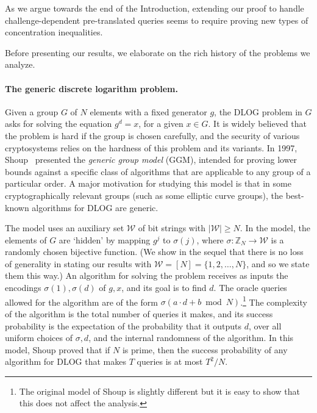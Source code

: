 \documentclass[11pt]{article}
\begin{document}
As we argue towards the end of the Introduction, extending our proof to handle challenge-dependent pre-translated queries seems to require proving new types of concentration inequalities. 

Before presenting our results, we elaborate on the rich history of the problems we analyze.


\paragraph{The generic discrete logarithm problem.} Given a group $G$ of $N$ elements with a fixed generator $g$, the DLOG problem in $G$ asks for solving the equation $g^d=x$, for a given $x \in G$. 
It is widely believed that the problem is hard if the group is chosen carefully, and the security of various cryptosystems relies on the hardness of this problem and its variants.
In 1997, Shoup~\cite{Shoup97} presented the \emph{generic group model} (GGM), intended for proving lower bounds against a specific class of algorithms that are applicable to any group of a particular order.
A major motivation for studying this model is that in some cryptographically relevant groups (such as some elliptic curve groups),
the best-known algorithms for DLOG are 
generic. 

The model uses an auxiliary set $\mathcal{W}$ of bit strings with $|\mathcal{W}|\geq N$. In the model, the elements of $G$ are `hidden' by mapping $g^j$ to $\sigma(j)$, where $\sigma:\mathbb{Z}_N \to \mathcal{W}$ is a randomly chosen bijective function. (We show in the sequel that there is no loss of generality in stating our results with $\mathcal{W}=[N] = \{1,2,\ldots,N\}$, and so we state them this way.) An algorithm for solving the problem receives as inputs the encodings $\sigma(1),\sigma(d)$ of $g,x$, and its goal is to find $d$. The oracle queries allowed for the algorithm are of the form $\sigma(a \cdot d+b \bmod N)$.\footnote{The original model of Shoup is slightly different but it is easy to show that this does not affect the analysis.} 
The complexity of the algorithm is the total number of queries it makes, and its success probability is the expectation of the probability that it outputs $d$, over all uniform choices of $\sigma,d$, and the internal randomness of the algorithm. In this model, Shoup proved that if $N$ is prime, then the success probability of any algorithm for DLOG that makes $T$ queries is at most $T^2/N$. 
\end{document}
